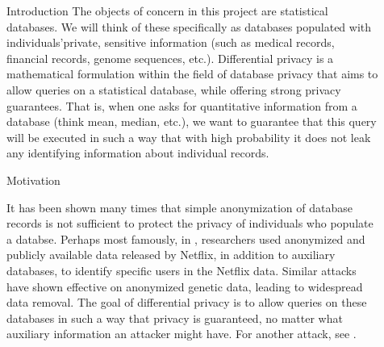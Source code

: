 \documentclass[final]{beamer}
\newlength{\sepwid}
\newlength{\onecolwid}
\newlength{\twocolwid}
\begin{document}
\begin{frame}[t]
\begin{columns}[t]
\begin{column}{\onecolwid}
\begin{block}{Introduction}
The objects of concern in this project are statistical databases. We will think of these specifically as databases populated with individuals'private, sensitive information (such as medical records, financial records, genome sequences, etc.). Differential privacy is a mathematical formulation within the field of database privacy that aims to allow queries on a statistical database, while offering strong privacy guarantees. That is, when one asks for quantitative information from a database (think mean, median, etc.), we want to guarantee that this query will be executed in such a way that with high probability it does not leak any identifying information about individual records.

\end{block}

\begin{block}{Motivation}

It has been shown many times that simple anonymization of database records is not sufficient to protect the privacy of individuals who populate a databse. Perhaps most famously, in \cite{narayanan2008robust}, researchers used anonymized and publicly available data released by Netflix, in addition to auxiliary databases, to identify specific users in the Netflix data. Similar attacks have shown effective on anonymized genetic data, leading to widespread data removal. The goal of differential privacy is to allow queries on these databases in such a way that privacy is guaranteed, no matter what auxiliary information an attacker might have. For another attack, see \cite{homer2008resolving}.

\end{block}



\end{column} %

\begin{column}{\sepwid}\end{column} %

\begin{column}{\twocolwid} %

\begin{columns}[t,totalwidth=\twocolwid] %

\begin{column}{\onecolwid}\vspace{-.6in} %


\end{column}
\end{columns}
\end{column}
\end{columns}
\end{frame}
\end{document}

